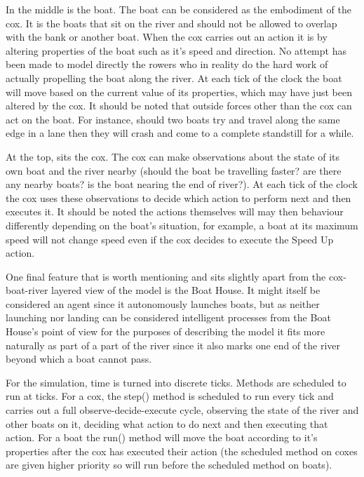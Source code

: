     In the middle is the boat. The boat can be considered as the embodiment of the cox. It is the boats that sit on the river and should not be allowed to overlap with the bank or another boat. When the cox carries out an action it is by altering properties of the boat such as it's speed and direction. No attempt has been made to model directly the rowers who in reality do the hard work of actually propelling the boat along the river. At each tick of the clock the boat will move based on the current value of its properties, which may have just been altered by the cox. It should be noted that outside forces other than the cox can act on the boat. For instance, should two boats try and travel along the same edge in a lane then they will crash and come to a complete standstill for a while.
    
    At the top, sits the cox. The cox can make observations about the state of its own boat and the river nearby (should the boat be travelling faster? are there any nearby boats? is the boat nearing the end of river?). At each tick of the clock the cox uses these observations to decide which action to perform next and then executes it. It should be noted the actions themselves will may then behaviour differently depending on the boat's situation, for example, a boat at its maximum speed will not change speed even if the cox decides to execute the Speed Up action.
    
    One final feature that is worth mentioning and sits slightly apart from the cox-boat-river layered view of the model is the Boat House. It might itself be considered an agent since it autonomously launches boats, but as neither launching nor landing can be considered intelligent processes from the Boat House's point of view for the purposes of describing the model it fits more naturally as part of a part of the river since it also marks one end of the river beyond which a boat cannot pass.
    
    For the simulation, time is turned into discrete ticks. Methods are scheduled to run at ticks. For a cox, the step() method is scheduled to run every tick and carries out a full observe-decide-execute cycle, observing the state of the river and other boats on it, deciding what action to do next and then executing that action. For a boat the run() method will move the boat according to it's properties after the cox has executed their action (the scheduled method on coxes are given higher priority so will run before the scheduled method on boats).
    
